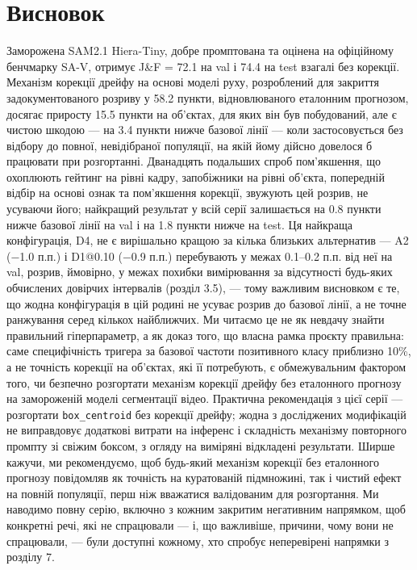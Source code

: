 \documentclass[11pt]{article}
\begin{document}
\section{Висновок}

Заморожена SAM2.1 Hiera-Tiny, добре промптована та оцінена на офіційному бенчмарку SA-V, отримує J\&F = 72.1 на val і 74.4 на test взагалі без корекції. Механізм корекції дрейфу на основі моделі руху, розроблений для закриття задокументованого розриву у 58.2 пункти, відновлюваного еталонним прогнозом, досягає приросту 15.5 пункти на об'єктах, для яких він був побудований, але є чистою шкодою --- на 3.4 пункти нижче базової лінії --- коли застосовується без відбору до повної, невідібраної популяції, на якій йому дійсно довелося б працювати при розгортанні. Дванадцять подальших спроб пом'якшення, що охоплюють гейтинг на рівні кадру, запобіжники на рівні об'єкта, попередній відбір на основі ознак та пом'якшення корекції, звужують цей розрив, не усуваючи його; найкращий результат у всій серії залишається на 0.8 пункти нижче базової лінії на val і на 1.8 пункти нижче на test. Ця найкраща конфігурація, D4, не є вирішально кращою за кілька близьких альтернатив --- A2 (−1.0 п.п.) і D1@0.10 (−0.9 п.п.) перебувають у межах 0.1--0.2 п.п. від неї на val, розрив, ймовірно, у межах похибки вимірювання за відсутності будь-яких обчислених довірчих інтервалів (розділ 3.5), --- тому важливим висновком є те, що жодна конфігурація в цій родині не усуває розрив до базової лінії, а не точне ранжування серед кількох найближчих. Ми читаємо це не як невдачу знайти правильний гіперпараметр, а як доказ того, що власна рамка проєкту правильна: саме специфічність тригера за базової частоти позитивного класу приблизно 10\%, а не точність корекції на об'єктах, які її потребують, є обмежувальним фактором того, чи безпечно розгортати механізм корекції дрейфу без еталонного прогнозу на замороженій моделі сегментації відео. Практична рекомендація з цієї серії --- розгортати \texttt{box\_centroid} без корекції дрейфу; жодна з досліджених модифікацій не виправдовує додаткові витрати на інференс і складність механізму повторного промпту зі свіжим боксом, з огляду на виміряні відкладені результати. Ширше кажучи, ми рекомендуємо, щоб будь-який механізм корекції без еталонного прогнозу повідомляв як точність на куратованій підмножині, так і чистий ефект на повній популяції, перш ніж вважатися валідованим для розгортання. Ми наводимо повну серію, включно з кожним закритим негативним напрямком, щоб конкретні речі, які не спрацювали --- і, що важливіше, причини, чому вони не спрацювали, --- були доступні кожному, хто спробує неперевірені напрямки з розділу 7.
\end{document}
